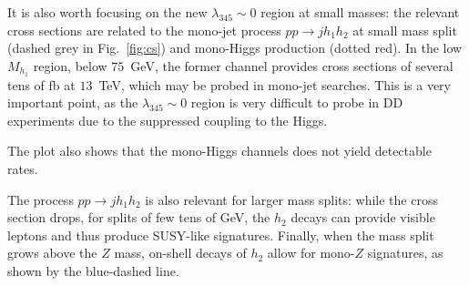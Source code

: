 \documentclass[12pt,a4paper]{article}
\newcommand {\red} {\color{red}}
\begin{document}

{It is also worth focusing on the new $\lambda_{345}\sim 0$ region at small masses: the relevant cross sections are related to the mono-jet process $p p \to j h_1 h_2$ at small mass split (dashed grey in Fig.~\ref{fig:cs}) and mono-Higgs production (dotted red).
In the low $M_{h_1}$ region, below $75$~GeV, the former channel provides cross sections of several tens of fb at $13$~TeV, which may be probed in mono-jet searches. This is a very important point, as the $\lambda_{345}\sim 0$ region is very difficult to probe in DD experiments due to the suppressed coupling to the Higgs.

The plot also shows that the mono-Higgs channels does not yield detectable rates.

The process $p p \to j h_1 h_2$ is also relevant for larger mass splits: while the cross section drops, for splits of few tens of GeV, the $h_2$ decays can provide visible leptons and thus produce SUSY-like signatures. Finally, when the mass split grows above the $Z$ mass, on-shell decays of $h_2$ allow for mono-$Z$ signatures, as shown by the blue-dashed line.
}
\end{document}

